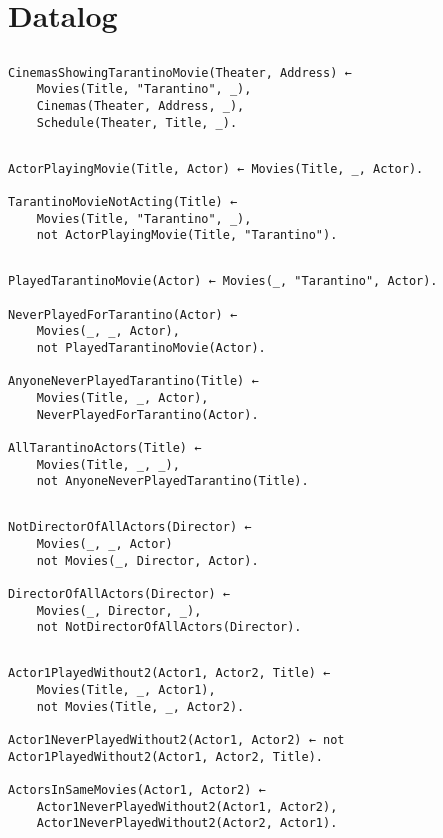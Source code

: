 \section{Datalog}
\subsection{}
\begin{verbatim}
CinemasShowingTarantinoMovie(Theater, Address) ←
    Movies(Title, "Tarantino", _),
    Cinemas(Theater, Address, _),
    Schedule(Theater, Title, _).    
\end{verbatim}

\subsection{}
\begin{verbatim}
ActorPlayingMovie(Title, Actor) ← Movies(Title, _, Actor).

TarantinoMovieNotActing(Title) ←
    Movies(Title, "Tarantino", _),
    not ActorPlayingMovie(Title, "Tarantino").
\end{verbatim}

\subsection{}
\begin{verbatim}
PlayedTarantinoMovie(Actor) ← Movies(_, "Tarantino", Actor).

NeverPlayedForTarantino(Actor) ← 
    Movies(_, _, Actor),
    not PlayedTarantinoMovie(Actor).

AnyoneNeverPlayedTarantino(Title) ←
    Movies(Title, _, Actor),
    NeverPlayedForTarantino(Actor).

AllTarantinoActors(Title) ←
    Movies(Title, _, _),
    not AnyoneNeverPlayedTarantino(Title).
\end{verbatim}


\subsection{}
\begin{verbatim}
NotDirectorOfAllActors(Director) ←
    Movies(_, _, Actor)
    not Movies(_, Director, Actor).

DirectorOfAllActors(Director) ←
    Movies(_, Director, _),
    not NotDirectorOfAllActors(Director).
\end{verbatim}

\subsection{}
\begin{verbatim}
Actor1PlayedWithout2(Actor1, Actor2, Title) ←
    Movies(Title, _, Actor1),
    not Movies(Title, _, Actor2).

Actor1NeverPlayedWithout2(Actor1, Actor2) ← not Actor1PlayedWithout2(Actor1, Actor2, Title).

ActorsInSameMovies(Actor1, Actor2) ←
    Actor1NeverPlayedWithout2(Actor1, Actor2),
    Actor1NeverPlayedWithout2(Actor2, Actor1).
\end{verbatim}


